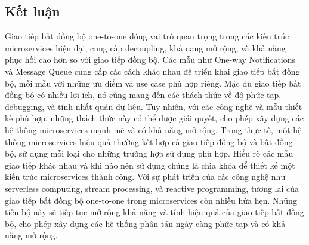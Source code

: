 \subsection{Kết luận}
Giao tiếp bất đồng bộ one-to-one đóng vai trò quan trọng trong các kiến trúc microservices hiện đại, cung cấp decoupling, khả năng mở rộng, và khả năng phục hồi cao hơn so với giao tiếp đồng bộ. Các mẫu như One-way Notifications và Message Queue cung cấp các cách khác nhau để triển khai giao tiếp bất đồng bộ, mỗi mẫu với những ưu điểm và use case phù hợp riêng.
Mặc dù giao tiếp bất đồng bộ có nhiều lợi ích, nó cũng mang đến các thách thức về độ phức tạp, debugging, và tính nhất quán dữ liệu. Tuy nhiên, với các công nghệ và mẫu thiết kế phù hợp, những thách thức này có thể được giải quyết, cho phép xây dựng các hệ thống microservices mạnh mẽ và có khả năng mở rộng.
Trong thực tế, một hệ thống microservices hiệu quả thường kết hợp cả giao tiếp đồng bộ và bất đồng bộ, sử dụng mỗi loại cho những trường hợp sử dụng phù hợp. Hiểu rõ các mẫu giao tiếp khác nhau và khi nào nên sử dụng chúng là chìa khóa để thiết kế một kiến trúc microservices thành công.
Với sự phát triển của các công nghệ như serverless computing, stream processing, và reactive programming, tương lai của giao tiếp bất đồng bộ one-to-one trong microservices còn nhiều hứa hẹn. Những tiến bộ này sẽ tiếp tục mở rộng khả năng và tính hiệu quả của giao tiếp bất đồng bộ, cho phép xây dựng các hệ thống phân tán ngày càng phức tạp và có khả năng mở rộng.
